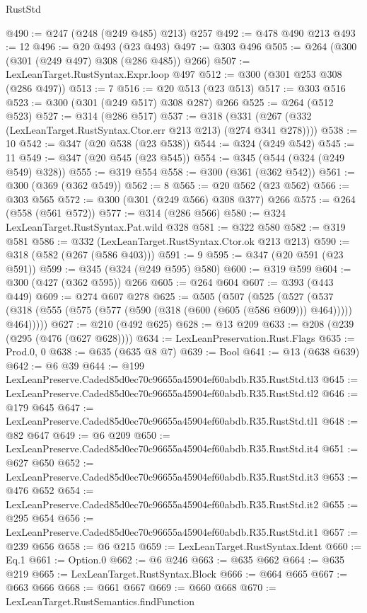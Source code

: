 \begin{lexlean}{RustStd}
\begin{coremodule}
@490 := @247 (@248 (@249 @485) @213) @257
@492 := @478 @490 @213
@493 := 12
@496 := @20 @493 (@23 @493)
@497 := @303 @496
@505 := @264 (@300 (@301 (@249 @497) @308 (@286 @485)) @266)
@507 := LexLeanTarget.RustSyntax.Expr.loop @497
@512 := @300 (@301 @253 @308 (@286 @497))
@513 := 7
@516 := @20 @513 (@23 @513)
@517 := @303 @516
@523 := @300 (@301 (@249 @517) @308 @287) @266
@525 := @264 (@512 @523)
@527 := @314 (@286 @517)
@537 := @318 (@331 (@267 (@332 (LexLeanTarget.RustSyntax.Ctor.err @213 @213) (@274 @341 @278))))
@538 := 10
@542 := @347 (@20 @538 (@23 @538))
@544 := @324 (@249 @542)
@545 := 11
@549 := @347 (@20 @545 (@23 @545))
@554 := @345 (@544 (@324 (@249 @549) @328))
@555 := @319 @554
@558 := @300 (@361 (@362 @542))
@561 := @300 (@369 (@362 @549))
@562 := 8
@565 := @20 @562 (@23 @562)
@566 := @303 @565
@572 := @300 (@301 (@249 @566) @308 @377) @266
@575 := @264 (@558 (@561 @572))
@577 := @314 (@286 @566)
@580 := @324 LexLeanTarget.RustSyntax.Pat.wild @328
@581 := @322 @580
@582 := @319 @581
@586 := @332 (LexLeanTarget.RustSyntax.Ctor.ok @213 @213)
@590 := @318 (@582 (@267 (@586 @403)))
@591 := 9
@595 := @347 (@20 @591 (@23 @591))
@599 := @345 (@324 (@249 @595) @580)
@600 := @319 @599
@604 := @300 (@427 (@362 @595)) @266
@605 := @264 @604
@607 := @393 (@443 @449)
@609 := @274 @607 @278
@625 := @505
    (@507
      (@525
        (@527
          (@537 (@318 (@555 (@575 (@577 (@590 (@318 (@600 (@605 (@586 @609))) @464))))) @464)))))
@627 := @210 (@492 @625)
@628 := @13 @209
@633 := @208 (@239 (@295 (@476 (@627 @628))))
@634 := LexLeanPreservation.Rust.Flags
@635 := Prod.{0, 0}
@638 := @635 (@635 @8 @7)
@639 := Bool
@641 := @13 (@638 @639)
@642 := @6 @39
@644 := @199 LexLeanPreserve.Caded85d0ec70c96655a45904ef60abdb.R35.RustStd.tl3
@645 := LexLeanPreserve.Caded85d0ec70c96655a45904ef60abdb.R35.RustStd.tl2
@646 := @179 @645
@647 := LexLeanPreserve.Caded85d0ec70c96655a45904ef60abdb.R35.RustStd.tl1
@648 := @82 @647
@649 := @6 @209
@650 := LexLeanPreserve.Caded85d0ec70c96655a45904ef60abdb.R35.RustStd.it4
@651 := @627 @650
@652 := LexLeanPreserve.Caded85d0ec70c96655a45904ef60abdb.R35.RustStd.it3
@653 := @476 @652
@654 := LexLeanPreserve.Caded85d0ec70c96655a45904ef60abdb.R35.RustStd.it2
@655 := @295 @654
@656 := LexLeanPreserve.Caded85d0ec70c96655a45904ef60abdb.R35.RustStd.it1
@657 := @239 @656
@658 := @6 @215
@659 := LexLeanTarget.RustSyntax.Ident
@660 := Eq.{1}
@661 := Option.{0}
@662 := @6 @246
@663 := @635 @662
@664 := @635 @219
@665 := LexLeanTarget.RustSyntax.Block
@666 := @664 @665
@667 := @663 @666
@668 := @661 @667
@669 := @660 @668
@670 := LexLeanTarget.RustSemantics.findFunction

\end{coremodule}
\end{lexlean}
